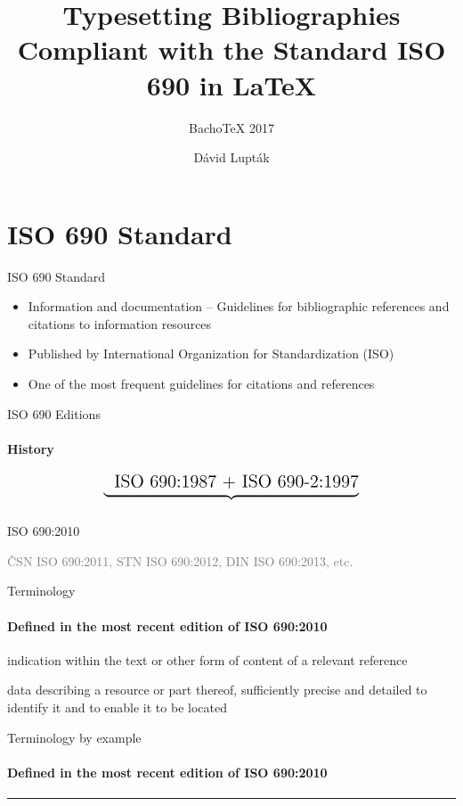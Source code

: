 \documentclass{beamer}
\author{Dávid Lupták}
\title{Typesetting Bibliographies Compliant with the Standard ISO 690 in LaTeX}
\subtitle{BachoTeX 2017}
\begin{document}
\frame{\titlepage}
\frame{\tableofcontents}

\section{ISO 690 Standard}

\begin{frame}{ISO 690 Standard}
\begin{itemize}
\item Information and documentation -- Guidelines for bibliographic
      references and citations to information resources
\item Published by International Organization for Standardization (ISO)
\item One of the most frequent guidelines for citations and references
\end{itemize}
\end{frame}

\begin{frame}{ISO 690 Editions}
\framesubtitle{History}
\[
\underbrace{\phantom{\text{-2}}\strut\text{\Large{ISO 690:1987 + ISO 690-2:1997}}}_\text{}
\]
\begin{center}
\LARGE{ISO 690:2010}
\end{center}
\begin{center}
\textcolor{Gray}{ČSN ISO 690:2011, STN ISO 690:2012, DIN ISO 690:2013, etc.}
\end{center}
\end{frame}

\begin{frame}{Terminology}
\framesubtitle{Defined in the most recent edition of ISO 690:2010}
\begin{description}[reference]
\item[citation] indication within the text or other form of content
      of a relevant reference
\item[reference] data describing a resource or part thereof,
      sufficiently precise and detailed to identify it and to enable
      it to be located
\end{description}
\end{frame}

\begin{refsection} %
\begin{frame}{Terminology by example}
\framesubtitle{Defined in the most recent edition of ISO 690:2010}
\rule{\textwidth}{0.2pt}
\printbibliography
\end{frame}
\end{refsection}
\end{document}

